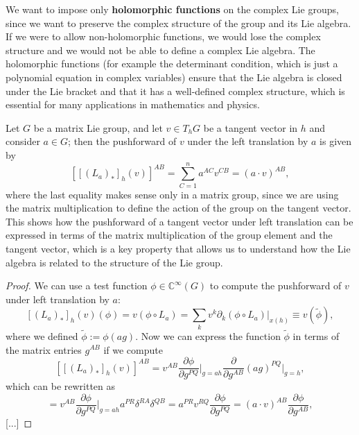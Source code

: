 We want to impose only \textbf{holomorphic functions} on the complex Lie groups, since we want to preserve the complex structure of the group and its Lie algebra. If we were to allow non-holomorphic functions, we would lose the complex structure and we would not be able to define a complex Lie algebra. The holomorphic functions (for example the determinant condition, which is just a polynomial equation in complex variables) ensure that the Lie algebra is closed under the Lie bracket and that it has a well-defined complex structure, which is essential for many applications in mathematics and physics.

\begin{lemma}
    Let \(G\) be a matrix Lie group, and let \(v \in T_h G\) be a tangent vector in \(h\) and consider \(a \in G\); then the pushforward of \(v\) under the left translation by \(a\) is given by
    \[
        [[(L_a)_*]_h(v)]^{AB} = \sum_{C=1}^n a^{AC} v^{CB} = (a \cdot v)^{AB},
    \]
    where the last equality makes sense only in a matrix group, since we are using the matrix multiplication to define the action of the group on the tangent vector. This shows how the pushforward of a tangent vector under left translation can be expressed in terms of the matrix multiplication of the group element and the tangent vector, which is a key property that allows us to understand how the Lie algebra is related to the structure of the Lie group.
\end{lemma}
\begin{proof}
    We can use a test function \(\phi \in \mathbb{C}^\infty(G)\) to compute the pushforward of \(v\) under left translation by \(a\):
    \[
        [(L_a)_*]_h(v)(\phi) = v(\phi \circ L_a) = \sum_{k} v^k \partial_k (\phi \circ L_a) \big|_{x(h)} \equiv v(\tilde{\phi}),
    \]
    where we defined \(\tilde{\phi} := \phi (ag)\). Now we can express the function \(\tilde{\phi}\) in terms of the matrix entries \(g^{AB}\) if we compute
    \[
        [[(L_a)_*]_h(v)]^{AB} = v^{AB} \frac{\partial \phi}{\partial g^{PQ}} \bigg|_{g = ah} \frac{\partial}{\partial g^{AB}} (ag)^{PQ} \bigg|_{g = h},
    \]
    which can be rewritten as
    \[
        = v^{AB} \frac{\partial \phi}{\partial g^{PQ}} \bigg|_{g = ah} a^{PR} \delta^{RA}\delta^{QB} = a^{PR} v^{RQ} \frac{\partial \phi}{\partial g^{PQ}} = (a \cdot v)^{AB} \frac{\partial \phi}{\partial g^{AB}},
    \]
    [...]
\end{proof}

